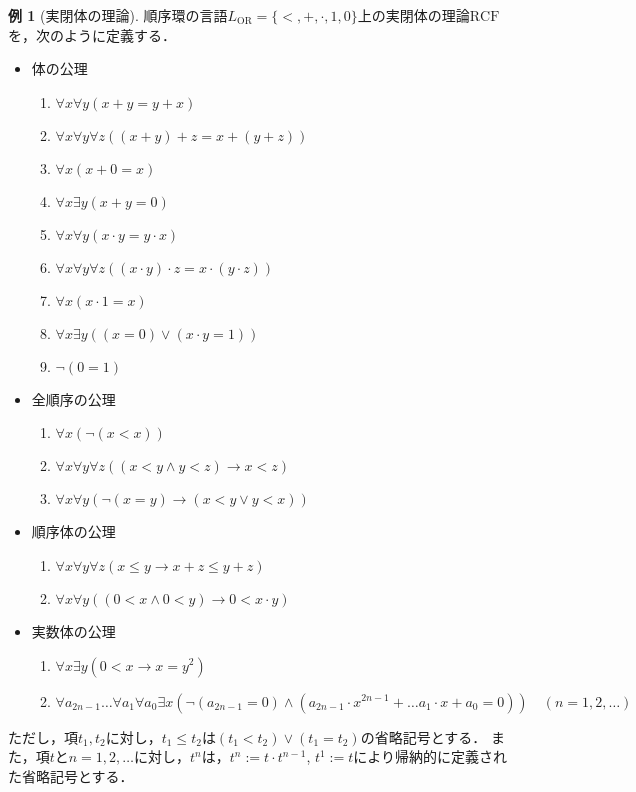 \documentclass[uplatex, dvipdfmx]{jsarticle}
\newcommand{\RCF}{\mathrm{RCF}}
\theoremstyle{definition}
\newtheorem{example}{例}[section]
\begin{document}
\begin{example}[実閉体の理論]
     順序環の言語$L_\mathrm{OR}=\{<, +, \cdot, 1, 0\}$上の実閉体の理論$\RCF$を，次のように定義する．
     
     \begin{itemize}
          \item 体の公理
          \begin{enumerate}
               \item $\forall x \forall y(x + y = y + x)$
               \item $\forall x \forall y \forall z((x + y) + z = x + (y + z))$
               \item $\forall x (x + 0 = x)$
               \item $\forall x \exists y (x + y = 0)$
               \item $\forall x \forall y(x \cdot y = y \cdot x)$
               \item $\forall x \forall y \forall z((x \cdot y) \cdot z = x \cdot (y \cdot z))$
               \item $\forall x (x \cdot 1 = x)$
               \item $\forall x \exists y ((x=0) \lor (x \cdot y = 1))$
               \item $\lnot(0 = 1)$
          \end{enumerate}
          \item 全順序の公理
          \begin{enumerate}
               \item $\forall x (\lnot(x<x))$
               \item $\forall x \forall y \forall z((x < y \land y < z) \rightarrow x < z)$
               \item $\forall x \forall y (\lnot(x = y) \rightarrow (x<y \lor y<x))$
          \end{enumerate}
          \item 順序体の公理
          \begin{enumerate}
               \item $\forall x \forall y \forall z (x \leq y \rightarrow x + z \leq y + z)$
               \item $\forall x \forall y ((0 < x \land 0 < y) \rightarrow 0 < x \cdot y )$
          \end{enumerate}
          \item 実数体の公理
          \begin{enumerate}
               \item $\forall x \exists y (0<x \rightarrow x=y^2)$
               \item $\forall a_{2n-1} \dots \forall a_1 \forall a_0 \exists x(\lnot(a_{2n-1} = 0) \land (a_{2n-1}\cdot x^{2n-1} + \dots a_1 \cdot x + a_0 = 0)) \quad (n=1,2,\dots)$ 
          \end{enumerate}
     \end{itemize}

     ただし，項$t_1, t_2$に対し，$t_1 \leq t_2$は$(t_1 < t_2)\lor(t_1 = t_2)$の省略記号とする．
     また，項$t$と$n=1,2,\dots$に対し，$t^n$は，$t^n:=t \cdot t^{n-1}$, $t^1:=t$により帰納的に定義された省略記号とする．
\end{example}
\end{document}
